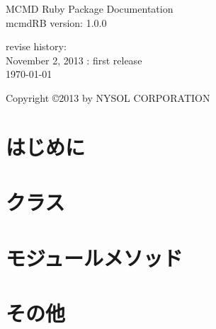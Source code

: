 \documentclass[a4paper]{jsbook}
\begin{document}
\begin{titlepage}
\begin{center}
{\huge MCMD Ruby Package Documentation}\\
\vspace{10truept}
{\normalsize mcmdRB version: 1.0.0}\\
\vspace{1cm}

revise history:\\
November 2, 2013 : first release\\
\vspace{18cm}
{\small \today}

{\small Copyright \copyright 2013 by NYSOL CORPORATION}
\end{center}
\end{titlepage}

\setcounter{tocdepth}{1}
\tableofcontents


%

%

%

\chapter{はじめに}



\chapter{クラス}






\chapter{モジュールメソッド}








\chapter{その他}



%
%
\end{document}
